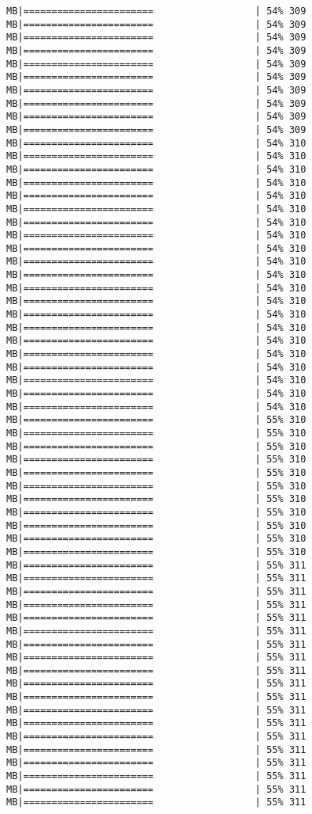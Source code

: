 \documentclass[
]{article}
\begin{document}
\begin{verbatim}
MB|=======================                  | 54% 309 MB|=======================                  | 54% 309 MB|=======================                  | 54% 309 MB|=======================                  | 54% 309 MB|=======================                  | 54% 309 MB|=======================                  | 54% 309 MB|=======================                  | 54% 309 MB|=======================                  | 54% 309 MB|=======================                  | 54% 309 MB|=======================                  | 54% 309 MB|=======================                  | 54% 310 MB|=======================                  | 54% 310 MB|=======================                  | 54% 310 MB|=======================                  | 54% 310 MB|=======================                  | 54% 310 MB|=======================                  | 54% 310 MB|=======================                  | 54% 310 MB|=======================                  | 54% 310 MB|=======================                  | 54% 310 MB|=======================                  | 54% 310 MB|=======================                  | 54% 310 MB|=======================                  | 54% 310 MB|=======================                  | 54% 310 MB|=======================                  | 54% 310 MB|=======================                  | 54% 310 MB|=======================                  | 54% 310 MB|=======================                  | 54% 310 MB|=======================                  | 54% 310 MB|=======================                  | 54% 310 MB|=======================                  | 54% 310 MB|=======================                  | 54% 310 MB|=======================                  | 55% 310 MB|=======================                  | 55% 310 MB|=======================                  | 55% 310 MB|=======================                  | 55% 310 MB|=======================                  | 55% 310 MB|=======================                  | 55% 310 MB|=======================                  | 55% 310 MB|=======================                  | 55% 310 MB|=======================                  | 55% 310 MB|=======================                  | 55% 310 MB|=======================                  | 55% 310 MB|=======================                  | 55% 311 MB|=======================                  | 55% 311 MB|=======================                  | 55% 311 MB|=======================                  | 55% 311 MB|=======================                  | 55% 311 MB|=======================                  | 55% 311 MB|=======================                  | 55% 311 MB|=======================                  | 55% 311 MB|=======================                  | 55% 311 MB|=======================                  | 55% 311 MB|=======================                  | 55% 311 MB|=======================                  | 55% 311 MB|=======================                  | 55% 311 MB|=======================                  | 55% 311 MB|=======================                  | 55% 311 MB|=======================                  | 55% 311 MB|=======================                  | 55% 311 MB|=======================                  | 55% 311 MB|=======================                  | 55% 311 
\end{verbatim}
\end{document}

